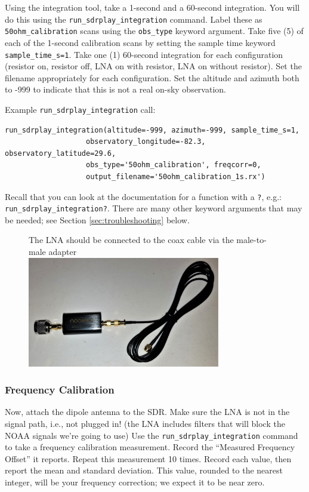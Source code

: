 \documentclass[11pt]{article}
\begin{document}
Using the integration tool, take a 1-second and a 60-second integration.
You will do this using the \verb|run_sdrplay_integration| command.
Label these as \verb|50ohm_calibration| scans using the \verb|obs_type| keyword argument.
Take five (5) of each of the 1-second calibration scans by setting the sample time keyword \verb|sample_time_s=1|.  Take one (1) 60-second integration
for each configuration (resistor on, resistor off, LNA on with resistor, LNA on without resistor).
Set the filename appropriately for each configuration.
Set the altitude and azimuth both to -999 to indicate that this
is not a real on-sky observation.


Example \verb|run_sdrplay_integration| call:\\
\begin{verbatim}
run_sdrplay_integration(altitude=-999, azimuth=-999, sample_time_s=1,
                   observatory_longitude=-82.3, observatory_latitude=29.6,
                   obs_type='50ohm_calibration', freqcorr=0,
                   output_filename='50ohm_calibration_1s.rx')
\end{verbatim}

Recall that you can look at the documentation for a function with a \verb|?|, e.g.:
\verb|run_sdrplay_integration?|.  There are many other keyword arguments that may be needed;
see Section \ref{sec:troubleshooting} below.



\begin{figure}[htp]
    \centering
    The LNA should be connected to the coax cable via the male-to-male adapter\\
\includegraphics[width=0.75\textwidth]{RadioLabPhotos/coaxcable_to_LNA.jpg}
\end{figure}

\subsubsection{Frequency Calibration}
\label{sec:freqcal}
Now, attach the dipole antenna to the SDR.
Make sure the LNA is not in the signal path, i.e., not plugged in!  (the LNA includes filters that will block the NOAA signals we're going to use)
Use the \verb|run_sdrplay_integration| command to take a frequency calibration measurement.
Record the ``Measured Frequency Offset'' it reports.
Repeat this measurement 10 times.
Record each value, then report the mean and standard deviation.
This value, rounded to the nearest integer, will be your frequency correction; we expect it to be near zero.
\end{document}
